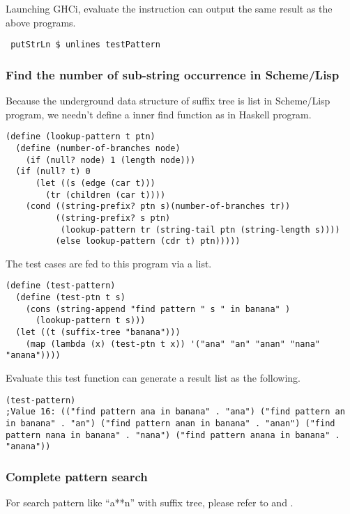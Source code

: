 \documentclass{article}
\begin{document}
Launching GHCi, evaluate the instruction can output the same result
as the above programs.

\begin{lstlisting}
 putStrLn $ unlines testPattern
\end{lstlisting} %

\subsubsection*{Find the number of sub-string occurrence in Scheme/Lisp}
Because the underground data structure of suffix tree is list in
Scheme/Lisp program, we needn't define a inner find function as
in Haskell program.

\lstset{language=lisp}
\begin{lstlisting}
(define (lookup-pattern t ptn)
  (define (number-of-branches node)
    (if (null? node) 1 (length node)))
  (if (null? t) 0
      (let ((s (edge (car t)))
	    (tr (children (car t))))
	(cond ((string-prefix? ptn s)(number-of-branches tr))
	      ((string-prefix? s ptn)
	       (lookup-pattern tr (string-tail ptn (string-length s))))
	      (else lookup-pattern (cdr t) ptn)))))
\end{lstlisting}

The test cases are fed to this program via a list.

\begin{lstlisting}
(define (test-pattern)
  (define (test-ptn t s)
    (cons (string-append "find pattern " s " in banana" )
	  (lookup-pattern t s)))
  (let ((t (suffix-tree "banana")))
    (map (lambda (x) (test-ptn t x)) '("ana" "an" "anan" "nana" "anana"))))
\end{lstlisting}

Evaluate this test function can generate a result list as the following.
\begin{lstlisting}
(test-pattern)
;Value 16: (("find pattern ana in banana" . "ana") ("find pattern an in banana" . "an") ("find pattern anan in banana" . "anan") ("find pattern nana in banana" . "nana") ("find pattern anana in banana" . "anana"))
\end{lstlisting}

\subsubsection{Complete pattern search}
For search pattern like ``a**n'' with suffix tree, please refer to \cite{ukkonen-lec} and \cite{ukkonen-search}.
\end{document}

